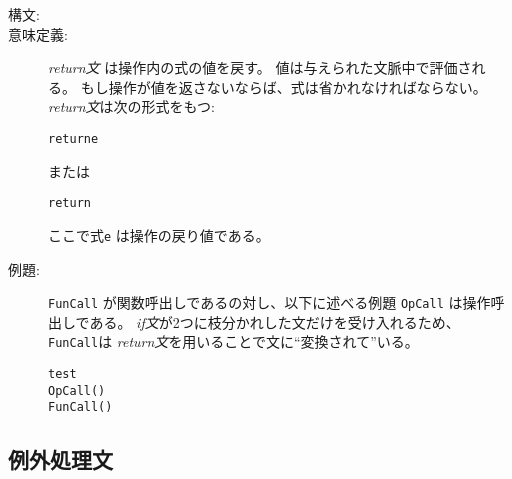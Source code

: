 \documentclass[\pformat,12pt]{jarticle}
\begin{document}
\begin{description}
\item[構文:]


\item[意味定義:]  {\it return文} は操作内の式の値を戻す。
値は与えられた文脈中で評価される。
もし操作が値を返さないならば、式は省かれなければならない。
 {\it return文\/}は次の形式をもつ:
  \begin{alltt}
    return e
  \end{alltt}
または
  \begin{alltt}
    return
  \end{alltt}
 ここで式{\tt e} は操作の戻り値である。

\item[例題:]  {\tt FunCall} が関数呼出しであるの対し、以下に述べる例題 {\tt OpCall} は操作呼出しである。
 {\it if文\/}が2つに枝分かれした文だけを受け入れるため、 {\tt FunCall}は  {\it return文}を用いることで文に``変換されて''いる。
  \begin{alltt}
     test
     OpCall()
      FunCall()
  \end{alltt}

\end{description}

\subsection{例外処理文}
\end{document}
